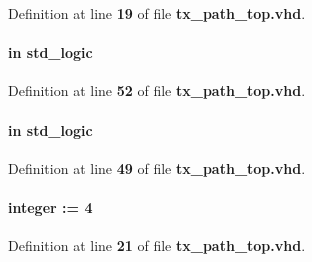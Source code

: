 Definition at line {\bf 19} of file {\bf tx\+\_\+path\+\_\+top.\+vhd}.

\paragraph[{mimo\+\_\+en}]{ {\bfseries \textcolor{keywordflow}{in}\textcolor{vhdlchar}{ }} {\bfseries \textcolor{comment}{std\+\_\+logic}\textcolor{vhdlchar}{ }} \hspace{0.3cm}{\ttfamily [Port]}}\label{classtx__path__top_a0c57670aee4f9fbfa3c286573012965a}


Definition at line {\bf 52} of file {\bf tx\+\_\+path\+\_\+top.\+vhd}.

\paragraph[{mode}]{ {\bfseries \textcolor{keywordflow}{in}\textcolor{vhdlchar}{ }} {\bfseries \textcolor{comment}{std\+\_\+logic}\textcolor{vhdlchar}{ }} \hspace{0.3cm}{\ttfamily [Port]}}\label{classtx__path__top_a219fe733f94bce997e904a6e45b1ac19}


Definition at line {\bf 49} of file {\bf tx\+\_\+path\+\_\+top.\+vhd}.

\paragraph[{n\+\_\+buff}]{ {\bfseries \textcolor{vhdlchar}{ }} {\bfseries \textcolor{comment}{integer}\textcolor{vhdlchar}{ }\textcolor{vhdlchar}{ }\textcolor{vhdlchar}{\+:}\textcolor{vhdlchar}{=}\textcolor{vhdlchar}{ }\textcolor{vhdlchar}{ } \textcolor{vhdldigit}{4} \textcolor{vhdlchar}{ }} \hspace{0.3cm}{\ttfamily [Generic]}}\label{classtx__path__top_a74ef544a10ab7244c6a066f8305f5e9c}


Definition at line {\bf 21} of file {\bf tx\+\_\+path\+\_\+top.\+vhd}.

